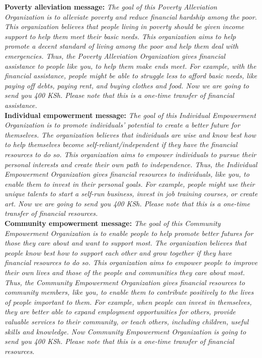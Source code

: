 \documentclass[11pt, a4paper]{article}\usepackage[]{graphicx}\usepackage[]{color}
\begin{document}
        \textbf{Poverty alleviation message:} \textit{The goal of this Poverty Alleviation Organization is to alleviate poverty and reduce financial hardship among the poor. This organization believes that people living in poverty should be given income support to help them meet their basic needs. This organization aims to help promote a decent standard of living among the poor and help them deal with emergencies. Thus, the Poverty Alleviation Organization gives financial assistance to people like you, to help them make ends meet. For example, with the financial assistance, people might be able to struggle less to afford basic needs, like paying off debts, paying rent, and buying clothes and food. Now we are going to send you 400 KSh. Please note that this is a one-time transfer of financial assistance.} \\

        \textbf{Individual empowerment message:} \textit{The goal of this Individual Empowerment Organization is to promote individuals' potential to create a better future for themselves.  The organization believes that individuals are wise and know best how to help themselves become self-reliant/independent if they have the financial resources to do so. This organization aims to empower individuals to pursue their personal interests and create their own path to independence. Thus, the Individual Empowerment Organization gives financial resources to individuals, like you, to enable them to invest in their personal goals. For example, people might use their unique talents to start a self-run business, invest in job training courses, or create art. Now we are going to send you 400 KSh. Please note that this is a one-time transfer of financial resources.} \\

        \textbf{Community empowerment message:} \textit{The goal of this Community Empowerment Organization is to enable people to help promote better futures for those they care about and want to support most. The organization believes that people know best how to support each other and grow together if they have financial resources to do so. This organization aims to empower people to improve their own lives and those of the people and communities they care about most. Thus, the Community Empowerment Organization gives financial resources to community members, like you, to enable them to contribute positively to the lives of people important to them. For example, when people can invest in themselves, they are better able to expand employment opportunities for others, provide valuable services to their community, or teach others, including children, useful skills and knowledge. Now Community Empowerment Organization is going to send you 400 KSh. Please note that this is a one-time transfer of financial resources.} \\
\end{document}
